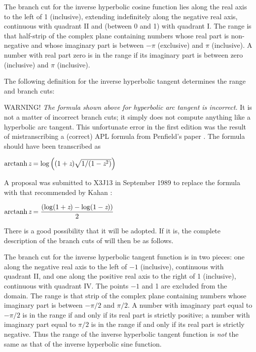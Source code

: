\begin{flushdesc}
The branch cut for the inverse hyperbolic cosine function
lies along the real axis to the left of 1 (inclusive), extending
indefinitely along the negative real axis, continuous with quadrant II
and (between 0 and 1) with quadrant I.
The range is that half-strip of the complex plane containing numbers whose
real part is non-negative and whose imaginary
part is between $-\pi$ (exclusive) and $\pi$ (inclusive).
A number with real part zero is in the range 
if its imaginary part is between zero (inclusive) and $\pi$ (inclusive).

\item[\cdf{atanh}]
The following definition for the inverse hyperbolic tangent
determines the range and branch cuts:

\begin{newer}
WARNING!  \emph{The formula shown above for hyperbolic arc tangent is incorrect.}
It is not a matter of incorrect branch cuts; it simply does not compute anything
like a hyperbolic arc tangent.  This unfortunate error in the first edition
was the result of mistranscribing a (correct) APL formula from Penfield's paper
\cite{APL-BRANCH-CUTS}.  The formula should have been transcribed as
\begin{tabbing}
$ \mathop\textrm{arctanh}\nolimits \emph{z}=\log \left((1+\emph{z})\sqrt{1/(1-\emph{z}^2)}\right) $
\end{tabbing}
\end{newer}

\begin{newer}
A proposal was submitted to X3J13 in September 1989 to replace the
formula  with that recommended by Kahan \cite{KAHAN-COMPLEX-FNS}:
\begin{tabbing}
$ \displaystyle \mathop\textrm{arctanh}\nolimits \emph{z}= { \left(\log(1+\emph{z}) - \log(1-\emph{z})\right) \over 2 } $
\end{tabbing}
There is a good possibility that it will be adopted.  If it is, the complete
description of the branch cuts of  will then be as follows.

The branch cut for the inverse hyperbolic tangent function
is in two pieces: one along the negative real axis to the left of
$-1$ (inclusive), continuous with quadrant II, and one along
the positive real axis to the right of 1 (inclusive), continuous with
quadrant IV.  The points $-1$ and 1 are excluded from the
domain.
The range is that strip of the complex plane containing
numbers whose imaginary part is between $-\pi/2$ and
$\pi/2$.  A number with imaginary part equal to $-\pi/2$
is in the range if and only if its real part is strictly positive; a number with
imaginary part equal to $\pi/2$ is in the range if and only if its real
part is strictly negative.  Thus the range of the inverse
hyperbolic tangent function is \emph{not} the same as
that of the inverse hyperbolic sine function.
\end{newer}
\end{flushdesc}

